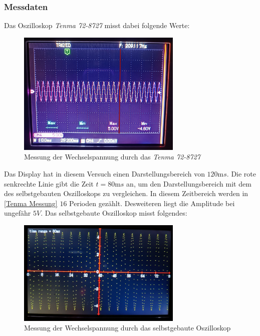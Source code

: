 \subsubsection{Messdaten}
Das Oszilloskop \textit{Tenma 72-8727} misst dabei folgende Werte:
\begin{figure}[h]
	\centering
	\includegraphics[width=0.7\textwidth]{images/sinus_profi_rot.jpg}
	\caption{Messung der Wechselspannung durch das \textit{Tenma 72-8727}}
	\label{Tenma Messung}
\end{figure}
\newline
Das Display hat in diesem Versuch einen Darstellungsbereich von $120\si{\milli s}$.
Die rote senkrechte Linie gibt die Zeit $t=80\si{\milli s}$ an, um den Darstellungsbereich mit dem
des selbstgebauten Oszilloskops zu vergleichen.
In diesem Zeitbereich werden in \autoref{Tenma Messung} $16$ Perioden gezählt.
Desweiteren  liegt die Amplitude bei ungefähr $5V$. \newpage
Das selbstgebaute Oszilloskop misst folgendes:
\begin{figure}[h]
	\centering
	\includegraphics[width=0.7\textwidth]{images/sinus_selbstgebaut.jpg}
	\caption{Messung der Wechselspannung durch das selbstgebaute Oszilloskop}
	\label{Selbstgebaut Messung}
\end{figure}
\newline
